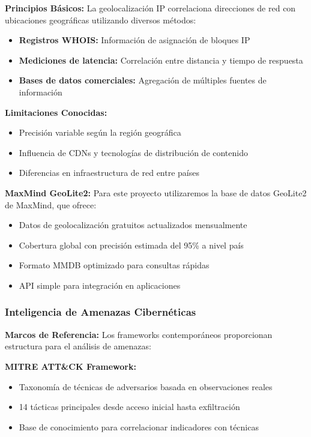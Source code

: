 \textbf{Principios Básicos:}
La geolocalización IP correlaciona direcciones de red con ubicaciones geográficas utilizando diversos métodos:

\begin{itemize}
    \item \textbf{Registros WHOIS:} Información de asignación de bloques IP
    \item \textbf{Mediciones de latencia:} Correlación entre distancia y tiempo de respuesta
    \item \textbf{Bases de datos comerciales:} Agregación de múltiples fuentes de información
\end{itemize}

\textbf{Limitaciones Conocidas:}
\begin{itemize}
    \item Precisión variable según la región geográfica
    \item Influencia de CDNs y tecnologías de distribución de contenido
    \item Diferencias en infraestructura de red entre países
\end{itemize}

\textbf{MaxMind GeoLite2:}
Para este proyecto utilizaremos la base de datos GeoLite2 de MaxMind, que ofrece:
\begin{itemize}
    \item Datos de geolocalización gratuitos actualizados mensualmente
    \item Cobertura global con precisión estimada del 95\% a nivel país
    \item Formato MMDB optimizado para consultas rápidas
    \item API simple para integración en aplicaciones
\end{itemize}

\subsubsection{Inteligencia de Amenazas Cibernéticas}

\textbf{Marcos de Referencia:}
Los frameworks contemporáneos proporcionan estructura para el análisis de amenazas:

\textbf{MITRE ATT\&CK Framework:}
\begin{itemize}
    \item Taxonomía de técnicas de adversarios basada en observaciones reales
    \item 14 tácticas principales desde acceso inicial hasta exfiltración
    \item Base de conocimiento para correlacionar indicadores con técnicas
\end{itemize}

